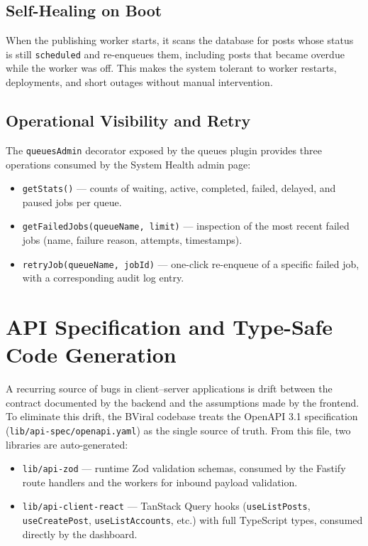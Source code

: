 \subsection{Self-Healing on Boot}

When the publishing worker starts, it scans the database for posts whose status is still \texttt{scheduled} and re-enqueues them, including posts that became overdue while the worker was off. This makes the system tolerant to worker restarts, deployments, and short outages without manual intervention.

\subsection{Operational Visibility and Retry}

The \texttt{queuesAdmin} decorator exposed by the queues plugin provides three operations consumed by the System Health admin page:

\begin{itemize}
    \item \texttt{getStats()} --- counts of waiting, active, completed, failed, delayed, and paused jobs per queue.
    \item \texttt{getFailedJobs(queueName, limit)} --- inspection of the most recent failed jobs (name, failure reason, attempts, timestamps).
    \item \texttt{retryJob(queueName, jobId)} --- one-click re-enqueue of a specific failed job, with a corresponding audit log entry.
\end{itemize}

\section{API Specification and Type-Safe Code Generation}

A recurring source of bugs in client--server applications is drift between the contract documented by the backend and the assumptions made by the frontend. To eliminate this drift, the BViral codebase treats the OpenAPI 3.1 specification (\texttt{lib/api-spec/openapi.yaml}) as the single source of truth. From this file, two libraries are auto-generated:

\begin{itemize}
    \item \texttt{lib/api-zod} --- runtime Zod validation schemas, consumed by the Fastify route handlers and the workers for inbound payload validation.
    \item \texttt{lib/api-client-react} --- TanStack Query hooks (\texttt{useListPosts}, \texttt{useCreatePost}, \texttt{useListAccounts}, etc.) with full TypeScript types, consumed directly by the dashboard.
\end{itemize}

